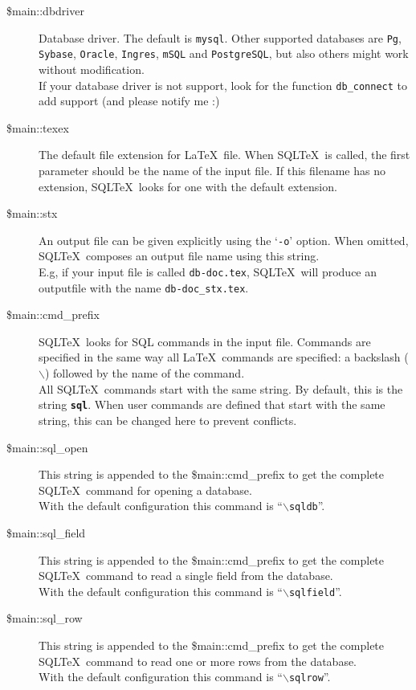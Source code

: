 \documentclass{article}
\newcommand{\bs}{\ensuremath{\backslash}}
\begin{document}
\begin{description}

\item[\$main::dbdriver] Database driver. The default is \texttt{mysql}.
Other supported databases are \texttt{Pg}, \texttt{Sybase}, \texttt{Oracle},
\texttt{Ingres}, \texttt{mSQL} and \texttt{PostgreSQL}, but also others might
work without modification. \\
If your database driver is not support, look for the function
\texttt{db\_connect} to add support (and please notify me :) 

\item[\$main::texex] The default file extension for \LaTeX\ file. When SQL\TeX\ is called, the first
parameter should be the name of the input file. If this filename has no extension,
SQL\TeX\ looks for one with the default extension.

\item[\$main::stx] An output file can be given explicitly using the `\texttt{-o}' option. When omitted,
SQL\TeX\ composes an output file name using this string.\\
E.g, if your input file is called \texttt{db-doc.tex}, SQL\TeX\ will produce an
outputfile with the name \texttt{db-doc\_stx.tex}.

\item[\$main::cmd\_prefix]\label{prefix} SQL\TeX\ looks for SQL commands in the input file. Commands are specified in the
same way all \LaTeX\ commands are specified: a backslash (\bs) followed by the
name of the command.\\
All SQL\TeX\ commands start with the same string. By default, this is the string
\texttt{\textbf{sql}}. When user commands are defined that start with the same
string, this can be changed here to prevent conflicts.

\item[\$main::sql\_open] This string is appended to the \$main::cmd\_prefix to
get the complete SQL\TeX\ command for opening a database.\\
With the default configuration this command is ``\texttt{\bs sqldb}''.

\item[\$main::sql\_field] This string is appended to the \$main::cmd\_prefix to
get the complete SQL\TeX\ command to read a single field from the database.\\
With the default configuration this command is ``\texttt{\bs sqlfield}''.

\item[\$main::sql\_row] This string is appended to the \$main::cmd\_prefix to
get the complete SQL\TeX\ command to read one or more rows from the database.\\
With the default configuration this command is ``\texttt{\bs sqlrow}''.


\end{description}
\end{document}
